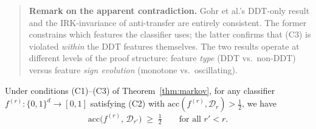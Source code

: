 \documentclass[runningheads]{llncs}
\begin{document}
\begin{quote}\small
\textbf{Remark on the apparent contradiction.}
Gohr et al.'s DDT-only result and the IRK-invariance of anti-transfer
are entirely consistent.
The former constrains which features the classifier uses;
the latter confirms that (C3) is violated \emph{within} the DDT features
themselves.
The two results operate at different levels of the proof structure:
feature \emph{type} (DDT vs.\ non-DDT) versus feature
\emph{sign evolution} (monotone vs.\ oscillating).
\end{quote}


\begin{proposition}
\label{prop:sign-preservation}
Under conditions \textup{(C1)--(C3)} of
Theorem~\textup{\ref{thm:markov}}, for any classifier
$f^{(r)}\colon \{0,1\}^d \to [0,1]$ satisfying \textup{(C2)} with
$\mathrm{acc}(f^{(r)}, \mathcal{D}_r) > \tfrac{1}{2}$, we have
\[
  \mathrm{acc}\bigl(f^{(r)},\, \mathcal{D}_{r'}\bigr)
  \;\geq\;
  \tfrac{1}{2}
  \qquad\text{for all } r' < r.
\]
\end{proposition}
\end{document}
